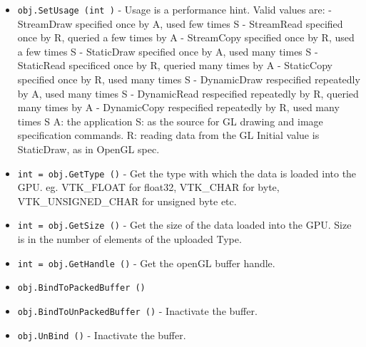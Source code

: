 \begin{itemize}
\item  \verb|obj.SetUsage (int )| -  Usage is a performance hint.
 Valid values are:
 - StreamDraw specified once by A, used few times S
 - StreamRead specified once by R, queried a few times by A
 - StreamCopy specified once by R, used a few times S
 - StaticDraw specified once by A, used many times S
 - StaticRead specificed once by R, queried many times by A
 - StaticCopy specified once by R, used many times S
 - DynamicDraw respecified repeatedly by A, used many times S
 - DynamicRead respecified repeatedly by R, queried many times by A
 - DynamicCopy respecified repeatedly by R, used many times S
 A: the application
 S: as the source for GL drawing and image specification commands.
 R: reading data from the GL
 Initial value is StaticDraw, as in OpenGL spec.

\item  \verb|int = obj.GetType ()| -  Get the type with which the data is loaded into the GPU.
 eg. VTK\_FLOAT for float32, VTK\_CHAR for byte, VTK\_UNSIGNED\_CHAR for
 unsigned byte etc.

\item  \verb|int = obj.GetSize ()| -  Get the size of the data loaded into the GPU. Size is in the number of
 elements of the uploaded Type.

\item  \verb|int = obj.GetHandle ()| -  Get the openGL buffer handle.

\item  \verb|obj.BindToPackedBuffer ()|

\item  \verb|obj.BindToUnPackedBuffer ()| -  Inactivate the buffer.

\item  \verb|obj.UnBind ()| -  Inactivate the buffer.

\end{itemize}
